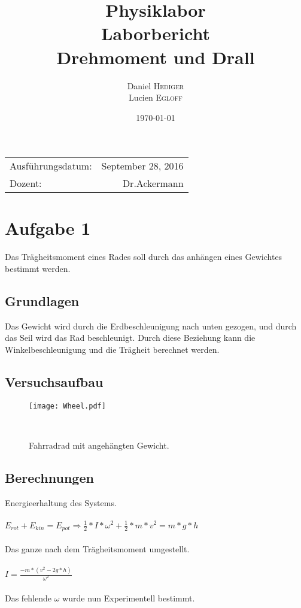 \documentclass{article}
\title{Physiklabor \\ Laborbericht \\ Drehmoment und Drall} %
\author{Daniel \textsc{Hediger} \\ Lucien \textsc{Egloff}} %
\date{\today} %
\begin{document}
\maketitle %

\begin{center}
\begin{tabular}{l r}
Ausführungsdatum: & September 28, 2016 \\ %
Dozent: & Dr.Ackermann %
\end{tabular}
\end{center}
\newpage
\tableofcontents 

\newpage
\section{Aufgabe 1}


Das Trägheitsmoment eines Rades soll durch das anhängen eines Gewichtes bestimmt werden.

\subsection{Grundlagen}

Das Gewicht wird durch die Erdbeschleunigung nach unten gezogen, und durch das Seil wird das Rad beschleunigt. Durch diese Beziehung kann die Winkelbeschleunigung und die Trägheit berechnet werden.

\subsection{Versuchsaufbau}
\begin{figure}[h]
\center

\texttt{[image: Wheel.pdf]} 
\caption{Fahrradrad mit angehängten Gewicht.}
\
\end{figure}

\subsection{Berechnungen}
Energieerhaltung des Systems.\\\\
$E_{rot}+E_{kin}=E_{pot}  \Rightarrow\frac{1}{2}*I*\omega^2+\frac{1}{2}*m*v^2=m*g*h$\\\\
Das ganze nach dem Trägheitsmoment umgestellt.\\\\
$I=\frac{-m*(v^2-2g*h)}{\omega^2} $\\\\
Das fehlende $\omega$ wurde nun Experimentell bestimmt.
\end{document}
